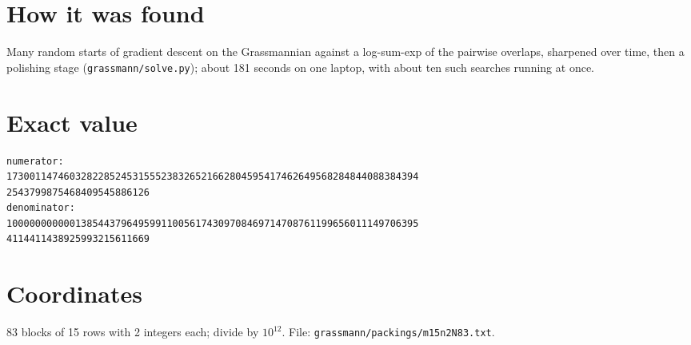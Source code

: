 \documentclass[11pt,a4paper]{article}
\begin{document}
\section{How it was found}
Many random starts of gradient descent on the Grassmannian against a log-sum-exp of the pairwise overlaps, sharpened over time, then a polishing stage (\texttt{grassmann/solve.py}); about 181 seconds on one laptop, with about ten such searches running at once.


\appendix
\section{Exact value}
{\small
\begin{verbatim}
numerator:
173001147460328228524531555238326521662804595417462649568284844088384394
2543799875468409545886126
denominator:
100000000000138544379649599110056174309708469714708761199656011149706395
4114411438925993215611669
\end{verbatim}}

\section{Coordinates}
83 blocks of 15 rows with 2 integers each; divide by $10^{12}$. File: \texttt{grassmann/packings/m15n2N83.txt}.
{\tiny
\begin{multicols}{4}
\end{multicols}}
\end{document}
